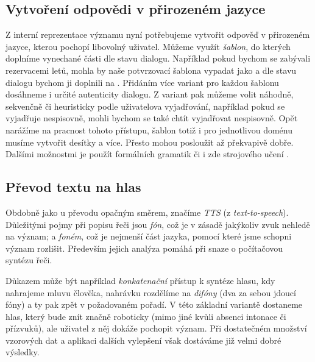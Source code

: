 \subsection{Vytvoření odpovědi v přirozeném jazyce}\label{nlg}

Z interní reprezentace významu nyní potřebujeme vytvořit odpověď v přirozeném
jazyce, kterou pochopí libovolný uživatel. Můžeme využít \textit{šablon}, do
kterých doplníme vynechané části dle stavu dialogu. Například pokud bychom
se zabývali rezervacemi letů, mohla by naše potvrzovací šablona vypadat jako
 a dle stavu dialogu
bychom ji doplnili na .
Přidáním více variant pro každou šablonu dosáhneme i určité autenticity dialogu.
Z variant pak můžeme volit náhodně, sekvenčně či heuristicky podle uživatelova
vyjadřování, například pokud se vyjadřuje nespisovně, mohli bychom se také
chtít vyjadřovat nespisovně. Opět narážíme na pracnost tohoto přístupu, šablon
totiž i pro jednotlivou doménu musíme vytvořit desítky a více. Přesto mohou
posloužit až překvapivě dobře. Dalšími možnostmi je použít formálních gramatik
\citep{teich_grammars_1999} či i zde strojového učení \citep{wen_stochastic_2015}.

\subsection{Převod textu na hlas}\label{tts}

Obdobně jako u převodu opačným směrem, značíme \textit{TTS} (z \textit{text-to-speech}).
Důležitými pojmy
při popisu řeči jsou \textit{fón}, což je v zásadě jakýkoliv zvuk nehledě na
význam; a \textit{foném}, což je nejmenší část jazyka,
pomocí které jsme schopni význam rozlišit. Především jejich analýza pomáhá
při snaze o počítačovou syntézu řeči.

Důkazem může být například
\textit{konkatenační} přístup k syntéze hlasu, kdy nahrajeme mluvu člověka,
nahrávku rozdělíme na \textit{difóny} (dva za sebou jdoucí fóny) a ty pak
zpět  v požadovaném pořadí. V této základní variantě dostaneme
hlas, který bude znít značně roboticky (mimo jiné kvůli absenci intonace či
přízvuků), ale uživatel z něj dokáže pochopit význam. Při dostatečném množství
vzorových dat a aplikaci dalších vylepšení však dostáváme již velmi dobré
výsledky.

